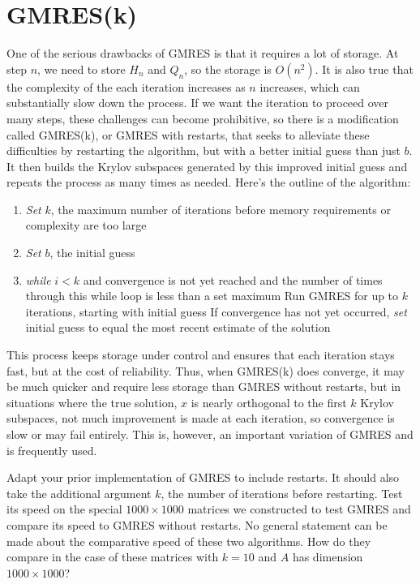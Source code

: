 \section*{GMRES(k)}
One of the serious drawbacks of GMRES is that it requires a lot of storage.
At step $n$, we need to store $H_n$ and $Q_n$, so the storage is $O(n^2)$.
It is also true that the complexity of the each iteration increases as $n$ increases, which can substantially slow down the process.
If we want the iteration to proceed over many steps, these challenges can become prohibitive, so there is a modification called GMRES(k), or GMRES with restarts, that seeks to alleviate these difficulties by restarting the algorithm, but with a better initial guess than just $b$.
It then builds the Krylov subspaces generated by this improved initial guess and repeats the process as many times as needed.
Here's the outline of the algorithm:
\begin{enumerate}
\item \emph{Set} $k$, the maximum number of iterations before memory requirements or complexity are too large
\item \emph{Set} $b$, the initial guess
\item \emph{while} $i<k$ and convergence is not yet reached and the number of times through this while loop is less than a set maximum
\subitem Run GMRES for up to $k$ iterations, starting with initial guess
\subitem If convergence has not yet occurred, \emph{set} initial guess to equal the most recent estimate of the solution
\end{enumerate}

This process keeps storage under control and ensures that each iteration stays fast, but at the cost of reliability.
Thus, when GMRES(k) does converge, it may be much quicker and require less storage than GMRES without restarts, but in situations where the true solution, $x$ is nearly orthogonal to the first $k$ Krylov subspaces, not much improvement is made at each iteration, so convergence is slow or may fail entirely.
This is, however, an important variation of GMRES and is frequently used.

\begin{problem}
Adapt your prior implementation of GMRES to include restarts.
It should also take the additional argument $k$, the number of iterations before restarting.
Test its speed on the special $1000\times 1000$ matrices we constructed to test GMRES and compare its speed to GMRES without restarts.
No general statement can be made about the comparative speed of these two algorithms.
How do they compare in the case of these matrices with $k=10$ and $A$ has dimension $1000\times 1000$?
\label{prob:GMRES3}
\end{problem}

